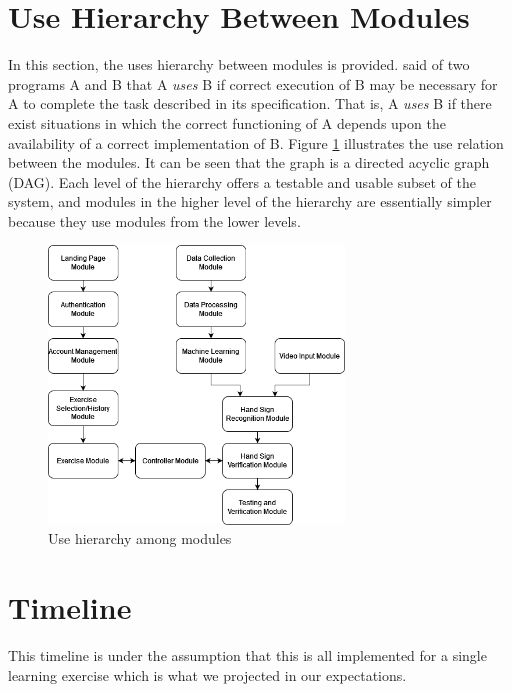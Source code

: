 \documentclass[12pt, titlepage]{article}
\begin{document}
\section{Use Hierarchy Between Modules} \label{SecUse}

In this section, the uses hierarchy between modules is
provided. \citet{Parnas1978} said of two programs A and B that A {\em uses} B if
correct execution of B may be necessary for A to complete the task described in
its specification. That is, A {\em uses} B if there exist situations in which
the correct functioning of A depends upon the availability of a correct
implementation of B.  Figure \ref{FigUH} illustrates the use relation between
the modules. It can be seen that the graph is a directed acyclic graph
(DAG). Each level of the hierarchy offers a testable and usable subset of the
system, and modules in the higher level of the hierarchy are essentially simpler
because they use modules from the lower levels.

\begin{figure}[H]
\centering
\includegraphics[width=0.7\textwidth]{UsesHierarchy.png}
\caption{Use hierarchy among modules}
\label{FigUH}
\end{figure}

\section{Timeline}
This timeline is under the assumption that this is all implemented for a single learning exercise which is what we projected in our expectations.
\end{document}
